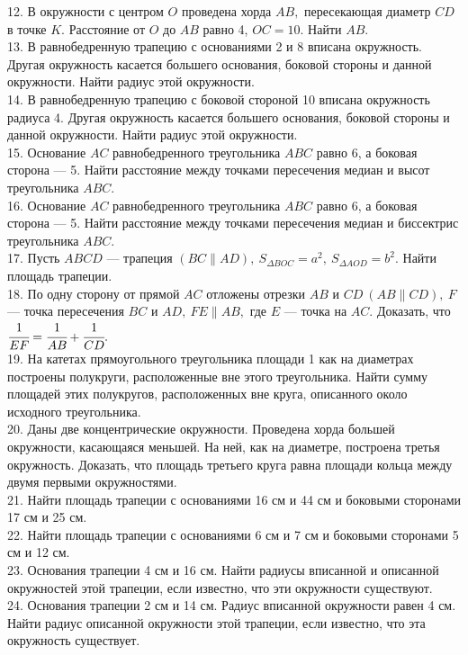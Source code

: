 12. В окружности с центром $O$ проведена хорда $AB,$ пересекающая диаметр $CD$ в точке $K.$ Расстояние от  $O$ до $AB$ равно 4, $OC=10.$ Найти $AB.$\\
13. В равнобедренную трапецию с основаниями 2 и 8 вписана окружность. Другая окружность касается большего основания, боковой стороны и данной окружности. Найти радиус этой окружности.\\
14. В равнобедренную трапецию с боковой стороной 10 вписана окружность радиуса 4. Другая окружность касается большего основания, боковой стороны и данной окружности. Найти радиус этой окружности.\\
15. Основание $AC$ равнобедренного треугольника $ABC$ равно 6, а боковая сторона --- 5. Найти расстояние между точками пересечения медиан и высот треугольника $ABC.$\\
16. Основание $AC$ равнобедренного треугольника $ABC$ равно 6, а боковая сторона --- 5. Найти расстояние между точками пересечения медиан и биссектрис треугольника $ABC.$\\
17. Пусть $ABCD$ --- трапеция $(BC\parallel AD),\ S_{\Delta BOC}=a^2,\ S_{\Delta AOD}=b^2.$ Найти площадь трапеции.\\
18. По одну сторону от прямой $AC$ отложены отрезки $AB$ и $CD\ (AB\parallel CD),\ F$ --- точка пересечения $BC$ и $AD,\ FE\parallel AB,$ где $E$ --- точка на $AC.$ Доказать, что $\cfrac{1}{EF}=\cfrac{1}{AB}+\cfrac{1}{CD}.$\\
19. На катетах прямоугольного треугольника площади 1 как на диаметрах построены полукруги, расположенные вне этого треугольника. Найти сумму площадей этих полукругов, расположенных вне круга, описанного около исходного треугольника.\\
20. Даны две концентрические окружности. Проведена хорда большей окружности, касающаяся меньшей. На ней, как на диаметре, построена третья окружность. Доказать, что площадь третьего круга равна площади кольца между двумя первыми окружностями.\\
21. Найти площадь трапеции с основаниями 16 см и 44 см и боковыми сторонами 17 см и 25 см.\\
22. Найти площадь трапеции с основаниями 6 см и 7 см и боковыми сторонами 5 см и 12 см.\\
23. Основания трапеции 4 см и 16 см. Найти радиусы вписанной и описанной окружностей этой трапеции, если известно, что эти окружности существуют.\\
24. Основания трапеции 2 см и 14 см. Радиус вписанной окружности равен 4 см. Найти радиус описанной окружности этой трапеции, если известно, что эта окружность существует.\\
